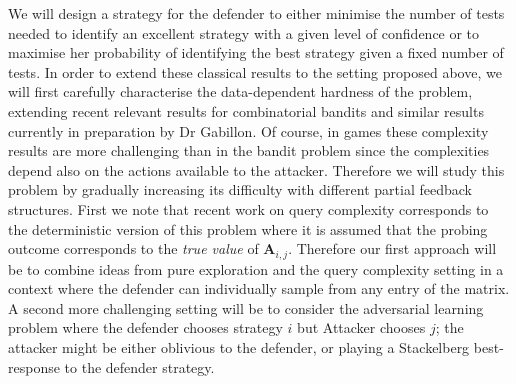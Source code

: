  We will design a strategy for the defender to either minimise the number of tests needed to identify an excellent strategy with a given level of confidence or to maximise her probability of identifying the best strategy given a fixed number of tests\cite{Maron93HR,Audibert10BA}. 
 In order to extend these  classical results to the setting proposed above, we will first carefully characterise the data-dependent hardness of the problem, extending recent relevant results for combinatorial bandits\cite{chen2014combinatorial} and similar results currently in preparation by Dr Gabillon.  Of course, in games these complexity results are more challenging than in the bandit problem since the complexities depend also on the actions available to the attacker.
  Therefore we will study this problem by gradually increasing its difficulty with different partial feedback structures. First we note that recent work\cite{goldberg2014query} on query complexity corresponds to the deterministic  version of this problem where it is assumed that the probing outcome corresponds to the {\em true value} of $\boldsymbol A_{i,j}$. %
Therefore our first approach will be to combine ideas from pure exploration and the query complexity setting in a context where the defender can individually sample from any entry of the matrix. A second more challenging setting will be to consider the adversarial learning problem where the defender chooses strategy $i$ but Attacker chooses $j$; the attacker might be either oblivious to the defender, or playing a Stackelberg best-response to the defender strategy.


